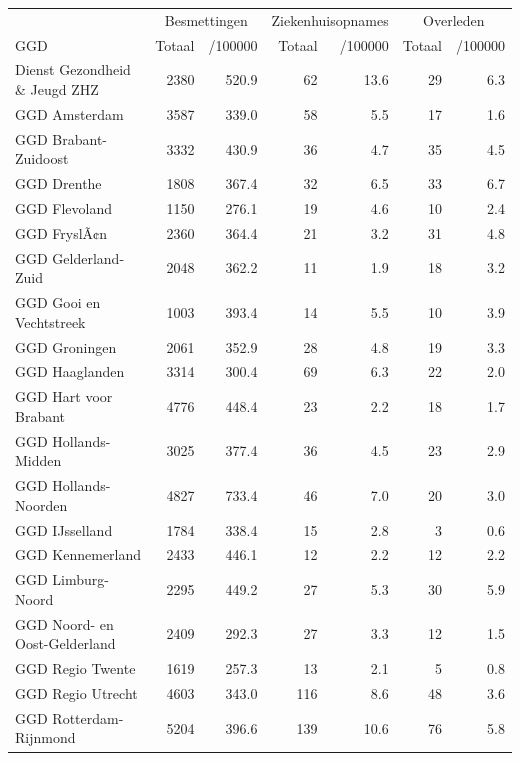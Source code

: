 \documentclass[
  english,
  man,floatsintext]{apa6}
\begin{document}
\begin{table}
\centering\begingroup\fontsize{10}{12}\selectfont

\begin{threeparttable}
\begin{tabular}{lrrrrrr}
\toprule
\multicolumn{1}{c}{ } & \multicolumn{2}{c}{Besmettingen} & \multicolumn{2}{c}{Ziekenhuisopnames} & \multicolumn{2}{c}{Overleden} \\
\cmidrule(l{3pt}r{3pt}){2-3} \cmidrule(l{3pt}r{3pt}){4-5} \cmidrule(l{3pt}r{3pt}){6-7}
GGD & Totaal & /100000 & Totaal & /100000 & Totaal & /100000\\
\midrule
Dienst Gezondheid \& Jeugd ZHZ & 2380 & 520.9 & 62 & 13.6 & 29 & 6.3\\
GGD Amsterdam & 3587 & 339.0 & 58 & 5.5 & 17 & 1.6\\
GGD Brabant-Zuidoost & 3332 & 430.9 & 36 & 4.7 & 35 & 4.5\\
GGD Drenthe & 1808 & 367.4 & 32 & 6.5 & 33 & 6.7\\
GGD Flevoland & 1150 & 276.1 & 19 & 4.6 & 10 & 2.4\\
GGD FryslÃ¢n & 2360 & 364.4 & 21 & 3.2 & 31 & 4.8\\
GGD Gelderland-Zuid & 2048 & 362.2 & 11 & 1.9 & 18 & 3.2\\
GGD Gooi en Vechtstreek & 1003 & 393.4 & 14 & 5.5 & 10 & 3.9\\
GGD Groningen & 2061 & 352.9 & 28 & 4.8 & 19 & 3.3\\
GGD Haaglanden & 3314 & 300.4 & 69 & 6.3 & 22 & 2.0\\
GGD Hart voor Brabant & 4776 & 448.4 & 23 & 2.2 & 18 & 1.7\\
GGD Hollands-Midden & 3025 & 377.4 & 36 & 4.5 & 23 & 2.9\\
GGD Hollands-Noorden & 4827 & 733.4 & 46 & 7.0 & 20 & 3.0\\
GGD IJsselland & 1784 & 338.4 & 15 & 2.8 & 3 & 0.6\\
GGD Kennemerland & 2433 & 446.1 & 12 & 2.2 & 12 & 2.2\\
GGD Limburg-Noord & 2295 & 449.2 & 27 & 5.3 & 30 & 5.9\\
GGD Noord- en Oost-Gelderland & 2409 & 292.3 & 27 & 3.3 & 12 & 1.5\\
GGD Regio Twente & 1619 & 257.3 & 13 & 2.1 & 5 & 0.8\\
GGD Regio Utrecht & 4603 & 343.0 & 116 & 8.6 & 48 & 3.6\\
GGD Rotterdam-Rijnmond & 5204 & 396.6 & 139 & 10.6 & 76 & 5.8\\

\end{tabular}
\end{threeparttable}
\end{table}
\end{document}
